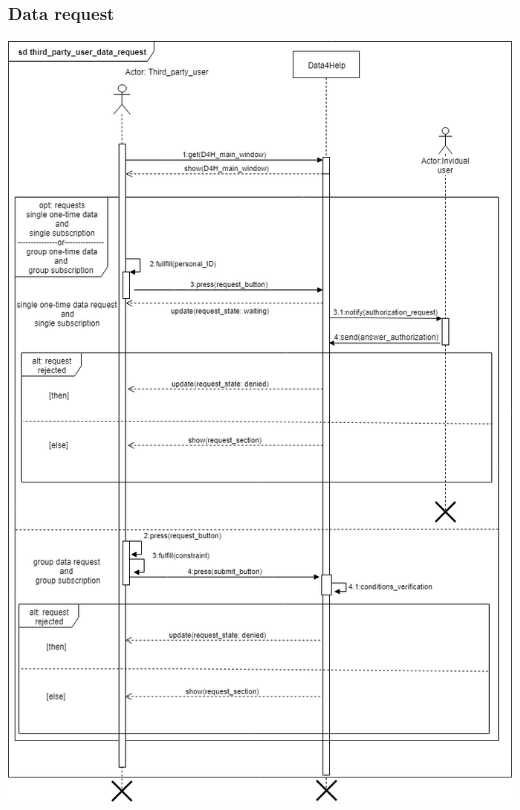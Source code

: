 \subsubsection{Data request}
\includegraphics[scale = 0.5]{sections/requirements/sequenceDiagrams/data_requests.png}
\clearpage
